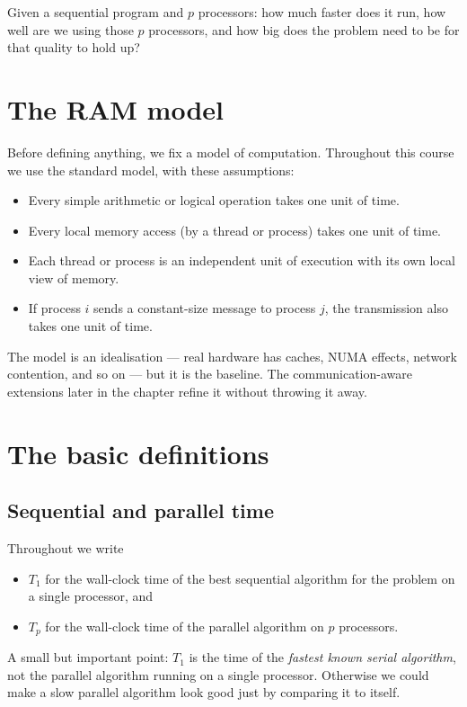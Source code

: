 \begin{ppkey}
Given a sequential program and $p$ processors: how much faster does it run,
how well are we using those $p$ processors, and how big does the problem
need to be for that quality to hold up?
\end{ppkey}

\section{The RAM model}

Before defining anything, we fix a model of computation. Throughout this
course we use the standard  model, with
these assumptions:

\begin{itemize}
  \item Every simple arithmetic or logical operation takes one unit of time.
  \item Every local memory access (by a thread or process) takes one unit of time.
  \item Each thread or process is an independent unit of execution with its
        own local view of memory.
  \item If process $i$ sends a constant-size message to process $j$, the
        transmission also takes one unit of time.
\end{itemize}

The model is an idealisation --- real hardware has caches, NUMA effects,
network contention, and so on --- but it is the baseline. The
communication-aware extensions later in the chapter refine it without
throwing it away.

\section{The basic definitions}

\subsection{Sequential and parallel time}

Throughout we write
\begin{itemize}
  \item $T_1$ for the wall-clock time of the best sequential algorithm for
        the problem on a single processor, and
  \item $T_p$ for the wall-clock time of the parallel algorithm on $p$ processors.
\end{itemize}
A small but important point: $T_1$ is the time of the
\emph{fastest known serial algorithm}, not the parallel algorithm running on
a single processor. Otherwise we could make a slow parallel algorithm look
good just by comparing it to itself.

